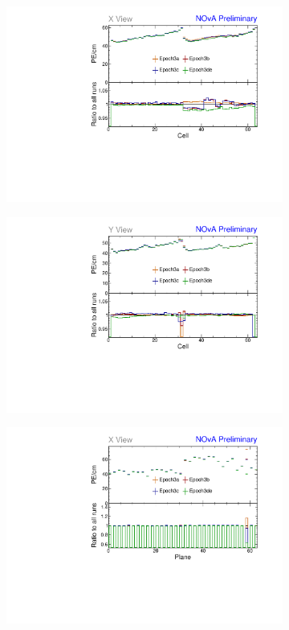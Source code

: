 \begin{figure}[!hbtp]
\begin{subfigure}[b]{0.495\textwidth}
\includegraphics[width=\textwidth]{Plots/TBCalibration/Attenprofs_P3Data_CellPE_X_Combined.pdf}
\end{subfigure}
\begin{subfigure}[b]{0.495\textwidth}
\centering
\includegraphics[width=\textwidth]{Plots/TBCalibration/Attenprofs_P3Data_CellPE_Y_Combined.pdf}
\end{subfigure}
\begin{subfigure}[b]{0.495\textwidth}
\centering
\includegraphics[width=\textwidth]{Plots/TBCalibration/Attenprofs_P3Data_PlanePE_X_Combined.pdf}

\end{subfigure}
\end{figure}
